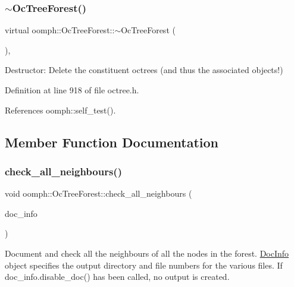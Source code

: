 \subsubsection{\texorpdfstring{$\sim$\+Oc\+Tree\+Forest()}{~OcTreeForest()}}
{\footnotesize\ttfamily virtual oomph\+::\+Oc\+Tree\+Forest\+::$\sim$\+Oc\+Tree\+Forest (\begin{DoxyParamCaption}{ }\end{DoxyParamCaption})\hspace{0.3cm}{\ttfamily [inline]}, {\ttfamily [virtual]}}



Destructor\+: Delete the constituent octrees (and thus the associated objects!) 



Definition at line 918 of file octree.\+h.



References oomph\+::self\+\_\+test().



\subsection{Member Function Documentation}
\mbox{\label{classoomph_1_1OcTreeForest_a762eaa5790197e03146d42957c03b33e}} 
\subsubsection{\texorpdfstring{check\+\_\+all\+\_\+neighbours()}{check\_all\_neighbours()}}
{\footnotesize\ttfamily void oomph\+::\+Oc\+Tree\+Forest\+::check\+\_\+all\+\_\+neighbours (\begin{DoxyParamCaption}\item[{\hyperlink{classoomph_1_1DocInfo}{Doc\+Info} \&}]{doc\+\_\+info }\end{DoxyParamCaption})\hspace{0.3cm}{\ttfamily [virtual]}}



Document and check all the neighbours of all the nodes in the forest. \hyperlink{classoomph_1_1DocInfo}{Doc\+Info} object specifies the output directory and file numbers for the various files. If {\ttfamily doc\+\_\+info.\+disable\+\_\+doc()} has been called, no output is created. 

